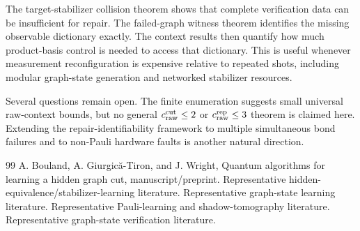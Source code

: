 \documentclass[11pt]{article}
\newcommand{\ccutraw}{c_{\rm raw}^{\rm cut}}
\newcommand{\crep}{c_{\rm raw}^{\rm rep}}
\begin{document}
The target-stabilizer collision theorem shows that complete verification data can be insufficient for repair. The failed-graph witness theorem identifies the missing observable dictionary exactly. The context results then quantify how much product-basis control is needed to access that dictionary. This is useful whenever measurement reconfiguration is expensive relative to repeated shots, including modular graph-state generation and networked stabilizer resources.

Several questions remain open. The finite enumeration suggests small universal raw-context bounds, but no general $\ccutraw\le2$ or $\crep\le3$ theorem is claimed here. Extending the repair-identifiability framework to multiple simultaneous bond failures and to non-Pauli hardware faults is another natural direction.

\begin{thebibliography}{99}
 A. Bouland, A. Giurgic\u{a}-Tiron, and J. Wright, Quantum algorithms for learning a hidden graph cut, manuscript/preprint.
 Representative hidden-equivalence/stabilizer-learning literature.
 Representative graph-state learning literature.
 Representative Pauli-learning and shadow-tomography literature.
 Representative graph-state verification literature.
\end{thebibliography}
\end{document}
